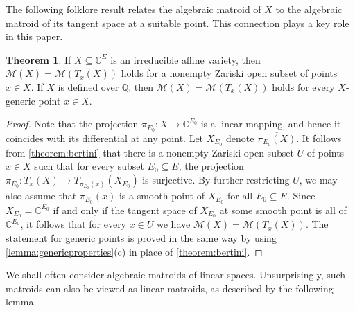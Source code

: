 \documentclass[11pt,a4paper,dvipsnames]{scrartcl}
\theoremstyle{definition}
\newtheorem{theorem}{Theorem}[section]
\newcommand{\CC}{\mathbb{C}}
\newcommand{\QQ}{\mathbb{Q}}
\newcommand{\algmat}[1]{\mathcal{M}(#1)}
\begin{document}
The following folklore result relates the algebraic matroid of $X$ to the algebraic matroid of its tangent space at a suitable point. This connection plays a key role in this paper.
\begin{theorem}\label{theorem:tangentspacematroid}
    If $X \subseteq \CC^E$ is an irreducible affine variety, then $\algmat{X} = \algmat{T_x(X)}$ holds for a nonempty Zariski open subset of points $x \in X$. If $X$ is defined over $\QQ$, then $\algmat{X} = \algmat{T_x(X)}$ holds for every $X$-generic point $x \in X$.
\end{theorem}
\begin{proof}
    Note that the projection $\pi_{E_0} : X \rightarrow \CC^{E_0}$ is a linear mapping, and hence it coincides with its differential at any point. Let $X_{E_0}$ denote $\overline{\pi_{E_0}(X)}$. It follows from \cref{theorem:bertini} that there is a nonempty Zariski open subset $U$ of points $x \in X$ such that for every subset $E_0 \subseteq E$, the projection $\pi_{E_0} : T_x(X) \rightarrow T_{\pi_{E_0}(x)}(X_{E_0})$ is surjective. By further restricting $U$, we may also assume that $\pi_{E_0}(x)$ is a smooth point of $X_{E_0}$ for all $E_0 \subseteq E$. Since $X_{E_0} = \CC^{E_0}$ if and only if the tangent space of $X_{E_0}$ at some smooth point is all of $\CC^{E_0}$, it follows that for every $x \in U$ we have $\algmat{X} = \algmat{T_x(X)}$. The statement for generic points is proved in the same way by using \cref{lemma:genericproperties}(c) in place of \cref{theorem:bertini}.
\end{proof}

We shall often consider algebraic matroids of linear spaces. Unsurprisingly, such matroids can also be viewed as linear matroids, as described by the following lemma.
\end{document}
